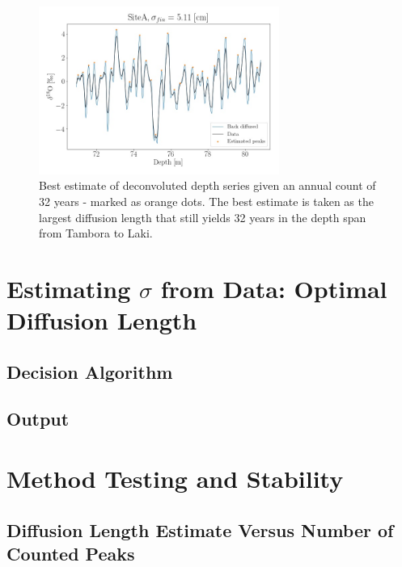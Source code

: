 \documentclass[../../CompleteThesis/Complete_1stDraft.tex]{subfiles}
\begin{document}
\begin{figure}
	\centering
	\includegraphics[width=0.7\textwidth]{SiteA_BackDiffused_Y32.jpg}
	\caption[Best estimate of deconvoluted depth series, Site A]{Best estimate of deconvoluted depth series given an annual count of 32 years - marked as orange dots. The best estimate is taken as the largest diffusion length that still yields 32 years in the depth span from Tambora to Laki.}
	\label{fig:SiteA_BackDiffused_Y32}
\end{figure}

\section[Optimal $\sigma$ Estimate]{Estimating $\sigma$ from Data: Optimal Diffusion Length}
\label{Sec:Method_OptimalSigmaEstimate}

\subsection[Decision algorithm]{Decision Algorithm}
\label{Subsec:Method_OptimalSigmaEstimate_DecisionAlgorithm}

\subsection[Output]{Output}
\label{Subsec:Method_OptimalSigmaEstimate_Output}



\section[Stability Tests]{Method Testing and Stability}
\label{Sec:Method_StabilityTests}

\subsection[Maximal $N_{\text{peaks}}$]{Diffusion Length Estimate Versus Number of Counted Peaks}
\label{Subsec:Method_StabilityTests_MaxNPeaks}
\end{document}

